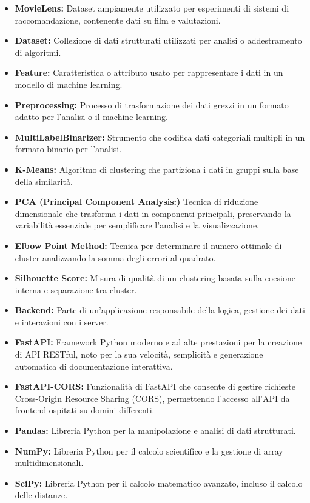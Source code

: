 \documentclass[a4paper,12pt]{article}
\begin{document}
\begin{itemize}
\item \textbf{MovieLens:} Dataset ampiamente utilizzato per esperimenti di sistemi di raccomandazione, contenente dati su film e valutazioni.
\item \textbf{Dataset:} Collezione di dati strutturati utilizzati per analisi o addestramento di algoritmi.
\item \textbf{Feature:} Caratteristica o attributo usato per rappresentare i dati in un modello di machine learning.
\item \textbf{Preprocessing:} Processo di trasformazione dei dati grezzi in un formato adatto per l'analisi o il machine learning.
\item \textbf{MultiLabelBinarizer:} Strumento che codifica dati categoriali multipli in un formato binario per l'analisi.
\item \textbf{K-Means:} Algoritmo di clustering che partiziona i dati in gruppi sulla base della similarità.
\item \textbf{PCA (Principal Component Analysis:)} Tecnica di riduzione dimensionale che trasforma i dati in componenti principali, preservando la variabilità essenziale per semplificare l'analisi e la visualizzazione.
\item \textbf{Elbow Point Method:} Tecnica per determinare il numero ottimale di cluster analizzando la somma degli errori al quadrato.
\item \textbf{Silhouette Score:} Misura di qualità di un clustering basata sulla coesione interna e separazione tra cluster.
\item \textbf{Backend:} Parte di un'applicazione responsabile della logica, gestione dei dati e interazioni con i server.
\item \textbf{FastAPI:} Framework Python moderno e ad alte prestazioni per la creazione di API RESTful, noto per la sua velocità, semplicità e generazione automatica di documentazione interattiva.
\item \textbf{FastAPI-CORS:} Funzionalità di FastAPI che consente di gestire richieste Cross-Origin Resource Sharing (CORS), permettendo l'accesso all'API da frontend ospitati su domini differenti.
\item \textbf{Pandas:} Libreria Python per la manipolazione e analisi di dati strutturati.
\item \textbf{NumPy:} Libreria Python per il calcolo scientifico e la gestione di array multidimensionali.
\item \textbf{SciPy:} Libreria Python per il calcolo matematico avanzato, incluso il calcolo delle distanze.

\end{itemize}
\end{document}

